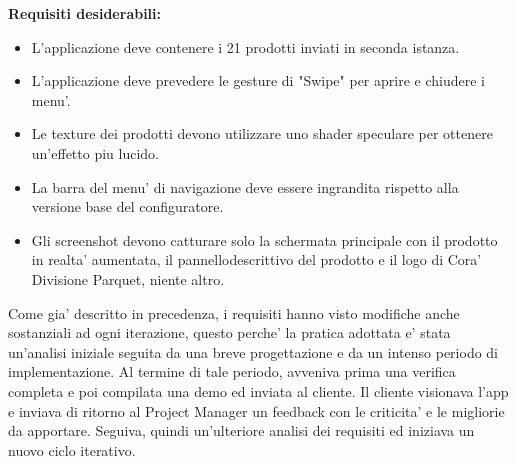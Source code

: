 \textbf{Requisiti desiderabili:}

\begin{itemize}
	\item L'applicazione deve contenere i 21 prodotti inviati in seconda istanza.
	
	\item L'applicazione deve prevedere le gesture di "Swipe" per aprire e chiudere i menu'.
	
	\item Le texture dei prodotti devono utilizzare uno shader speculare per ottenere un'effetto piu lucido.
	
	\item La barra del menu' di navigazione deve essere ingrandita rispetto alla versione base del configuratore.
	
	\item Gli screenshot devono catturare solo la schermata principale con il prodotto in realta' aumentata, il pannellodescrittivo del prodotto e il logo di Cora' Divisione Parquet, niente altro.
\end{itemize}

Come gia' descritto in precedenza, i requisiti hanno visto modifiche anche sostanziali ad ogni iterazione, questo perche' la pratica adottata e' stata un'analisi iniziale seguita da una breve progettazione e da un intenso periodo di implementazione. Al termine di tale periodo, avveniva prima una verifica completa e poi compilata una demo ed inviata al cliente. Il cliente visionava l'app e inviava di ritorno al Project Manager un feedback con le criticita' e le migliorie da apportare. Seguiva, quindi un'ulteriore analisi dei requisiti ed iniziava un nuovo ciclo iterativo.\\\\



